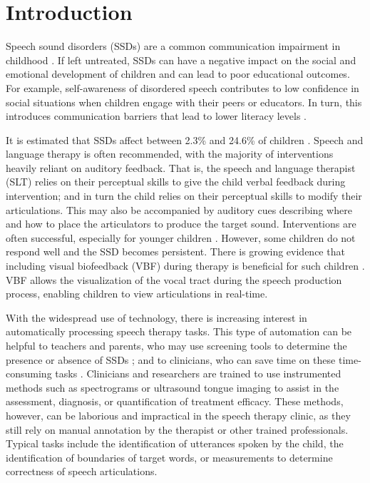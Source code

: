 
\section{Introduction}

Speech sound disorders (SSDs) are a common communication impairment in childhood \citep{wren2016prevalence}.
If left untreated, SSDs can have a negative impact on the social and emotional development of children and can lead to poor educational outcomes.
For example, self-awareness of disordered speech contributes to low confidence in social situations when children engage with their peers or educators. In turn, this introduces communication barriers that lead to lower literacy levels  \citep{johnson2010twenty, lewis2011literacy, mccormack2011nationally}.

It is estimated that SSDs affect between 2.3\% and 24.6\% of children \citep{law2000prevalence, wren2016prevalence}.
Speech and language therapy is often recommended, with the majority of interventions heavily reliant on auditory feedback. That is, the speech and language therapist (SLT) relies on their perceptual skills to give the child verbal feedback during intervention; and in turn the child relies on their perceptual skills to modify their articulations. This may also be accompanied by auditory cues describing where and how to place the articulators to produce the target sound.
Interventions are often successful, especially for younger children \citep{mcleod2020waiting}.
However, some children do not respond well and the SSD becomes persistent.
There is growing evidence that including visual biofeedback (VBF) during therapy is beneficial for such children \citep{sugden2019systematic}.
VBF allows the visualization of the vocal tract during the speech production process, enabling children to view articulations in real-time.

With the widespread use of technology, there is increasing interest in automatically processing speech therapy tasks.
This type of automation can be helpful to teachers and parents, who may use screening tools to determine the presence or absence of SSDs \citep{sadeghian2015towards, ward2016automated}; and to clinicians, who can save time on these time-consuming tasks \citep{ribeiro2019ultrasound}.
Clinicians and researchers are trained to use instrumented methods such as spectrograms or ultrasound tongue imaging to assist in the assessment, diagnosis, or quantification of treatment efficacy.
These methods, however, can be laborious and impractical in the speech therapy clinic, as they still rely on manual annotation by the therapist or other trained professionals.
Typical tasks include the identification of utterances spoken by the child, the identification of boundaries of target words, or measurements to determine correctness of speech articulations.

